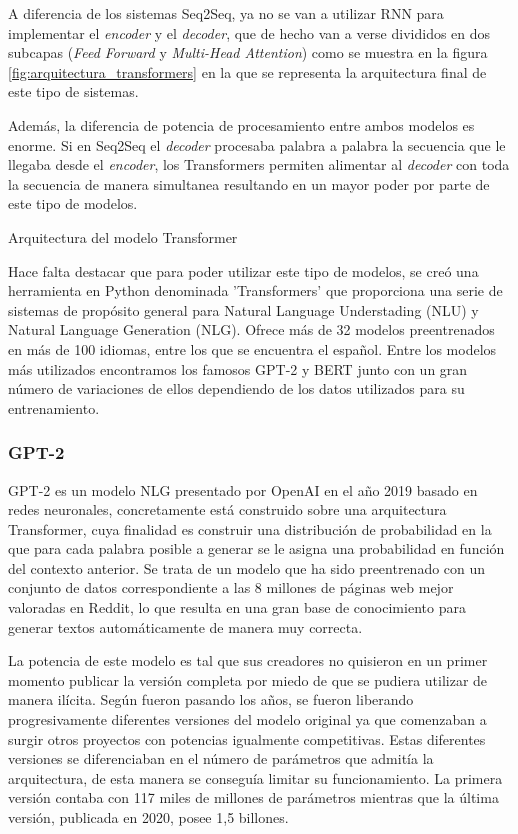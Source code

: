 A diferencia de los sistemas Seq2Seq, ya no se van a utilizar RNN  para implementar el \textit{encoder} y el \textit{decoder}, que de hecho van a verse divididos en dos subcapas (\textit{Feed Forward} y \textit{Multi-Head Attention}) como se muestra en la figura \ref{fig:arquitectura_transformers} en la que se representa la arquitectura final de este tipo de sistemas.

Además, la diferencia de potencia de procesamiento entre ambos modelos es enorme. Si en Seq2Seq el \textit{decoder} procesaba palabra a palabra la secuencia que le llegaba desde el \textit{encoder}, los Transformers permiten alimentar al \textit{decoder} con toda la secuencia de manera simultanea resultando en un mayor poder por parte de este tipo de modelos.

%
{Arquitectura del modelo Transformer}

Hace falta destacar que para poder utilizar este tipo de modelos, se creó una herramienta en Python denominada 'Transformers' que proporciona una serie de sistemas de propósito general para Natural Language Understading (NLU) y Natural Language Generation (NLG). Ofrece más de 32 modelos preentrenados en más de 100 idiomas, entre los que se encuentra el español. Entre los modelos más utilizados encontramos los famosos GPT-2 y BERT junto con un gran número de variaciones de ellos dependiendo de los datos utilizados para su entrenamiento.

\subsubsection{GPT-2}
GPT-2 es un modelo NLG presentado por OpenAI en el año 2019 basado en redes neuronales, concretamente está construido sobre una arquitectura Transformer, cuya finalidad es construir una distribución de probabilidad en la que para cada palabra posible a generar se le asigna una probabilidad en función del contexto anterior. Se trata de un modelo que ha sido preentrenado con un conjunto de datos correspondiente a las 8 millones de páginas web mejor valoradas en Reddit, lo que resulta en una gran base de conocimiento para generar textos automáticamente de manera muy correcta.

La potencia de este modelo es tal que sus creadores no quisieron en un primer momento publicar la versión completa por miedo de que se pudiera utilizar de manera ilícita. Según fueron pasando los años, se fueron liberando progresivamente diferentes versiones del modelo original ya que comenzaban a surgir otros proyectos con potencias igualmente competitivas. Estas diferentes versiones se diferenciaban en el número de parámetros que admitía la arquitectura, de esta manera se conseguía limitar su funcionamiento. La primera versión contaba con 117 miles de millones de parámetros mientras que la última versión, publicada en 2020, posee 1,5 billones.

